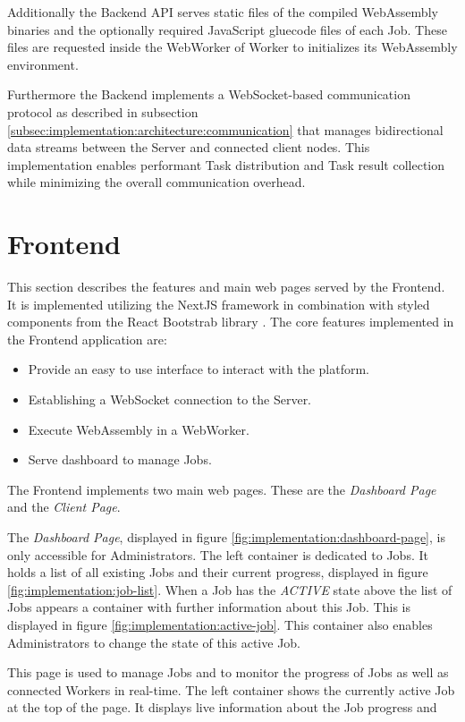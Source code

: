 Additionally the Backend \ac{API} serves static files of the compiled WebAssembly binaries and the optionally required JavaScript gluecode files of each Job. These files are requested inside the WebWorker of Worker to initializes its WebAssembly environment.

Furthermore the Backend implements a WebSocket-based communication protocol as described in subsection \ref{subsec:implementation:architecture:communication} that manages bidirectional data streams between the Server and connected client nodes. This implementation enables performant Task distribution and Task result collection while minimizing the overall communication overhead.

\section{Frontend}
\label{sec:implementation:frontend}
This section describes the features and main web pages served by the Frontend. It is implemented utilizing the NextJS framework in combination with styled components from the React Bootstrab library \cite{implementation:bootstrap}. The core features implemented in the Frontend application are:

\begin{itemize}
    \item Provide an easy to use interface to interact with the platform.
    \item Establishing a WebSocket connection to the Server.
    \item Execute WebAssembly in a WebWorker.
    \item Serve dashboard to manage Jobs.
\end{itemize}

The Frontend implements two main web pages. These are the \emph{Dashboard Page} and the \emph{Client Page}.

The \emph{Dashboard Page}, displayed in figure \ref{fig:implementation:dashboard-page}, is only accessible for Administrators. The left container is dedicated to Jobs. It holds a list of all existing Jobs and their current progress, displayed in figure \ref{fig:implementation:job-list}. When a Job has the \emph{ACTIVE} state above the list of Jobs appears a container with further information about this Job. This is displayed in figure \ref{fig:implementation:active-job}. This container also enables Administrators to change the state of this active Job.

This page is used to manage Jobs and to monitor the progress of Jobs as well as connected Workers in real-time. The left container shows the currently active Job at the top of the page. It displays live information about the Job progress and

